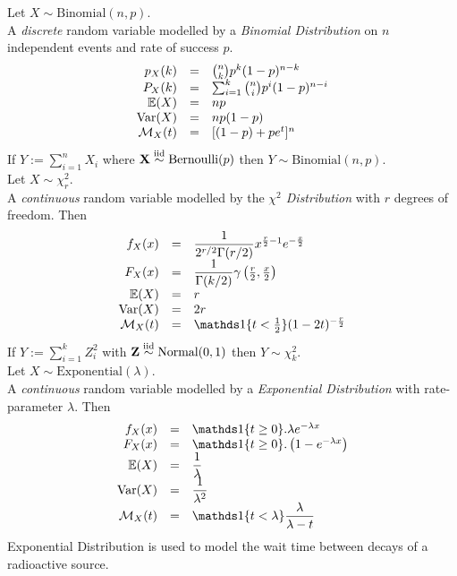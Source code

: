 \documentclass[11pt,a4paper]{article}
\begin{document}
Let $X\sim\text{Binomial}(n,p)$.\\
A \textit{discrete} random variable modelled by a \textit{Binomial Distribution} on $n$ independent events and rate of success $p$.\\
\[\begin{array}{rcl}
p_X(k)&=&{n\choose k}p^k(1-p)^{n-k}\\
P_X(k)&=&\sum_{i=1}^k{n\choose i}p^i(1-p)^{n-i}\\
\mathbb{E}(X)&=&np\\
\mathrm{Var}(X)&=&np(1-p)\\
\mathcal{M}_X(t)&=&[(1-p)+pe^t]^n
\end{array}\]
\nb If $Y:=\sum_{i=1}^nX_i$ where $\textbf{X}\overset{\text{iid}}{\sim}\text{Bernoulli}(p)$ then $Y\sim\text{Binomial}(n,p)$.\\

Let $X\sim\chi^2_r$.\\
A \textit{continuous} random variable modelled by the \textit{$\chi^2$ Distribution} with $r$ degrees of freedom. Then
\[\begin{array}{rcl}
f_X(x)&=&\dfrac{1}{2^{r/2}\Gamma(r/2)}x^{\frac{r}{2}-1}e^{-\frac{x}{2}}\\
F_X(x)&=&\dfrac{1}{\Gamma(k/2)}\gamma\left(\frac{r}{2},\frac{x}{2}\right)\\
\expect(X)&=&r\\
\var(X)&=&2r\\
\mathcal{M}_X(t)&=&\indicator\{t<\frac{1}{2}\}(1-2t)^{-\frac{r}{2}}
\end{array}\]
\nb If $Y:=\sum_{i=1}^kZ_i^2$ with $\textbf{Z}\overset{\text{iid}}{\sim}\text{Normal}(0,1)$ then $Y\sim\chi^2_k$.\\

Let $X\sim\text{Exponential}(\lambda)$.\\
A \textit{continuous} random variable modelled by a \textit{Exponential Distribution} with rate-parameter $\lambda$. Then
\[\begin{array}{rcl}
f_X(x)&=&\indicator\{t\geq0\}.\lambda e^{-\lambda x}\\
F_X(x)&=&\indicator\{t\geq0\}.\left(1-e^{-\lambda x}\right)\\
\expect(X)&=&\dfrac{1}{\lambda}\\
\var(X)&=&\dfrac{1}{\lambda^2}\\
\mathcal{M}_X(t)&=&\indicator\{t<\lambda\}\dfrac{\lambda}{\lambda-t}
\end{array}\]
\nb Exponential Distribution is used to model the wait time between decays of a radioactive source.\\
\end{document}
